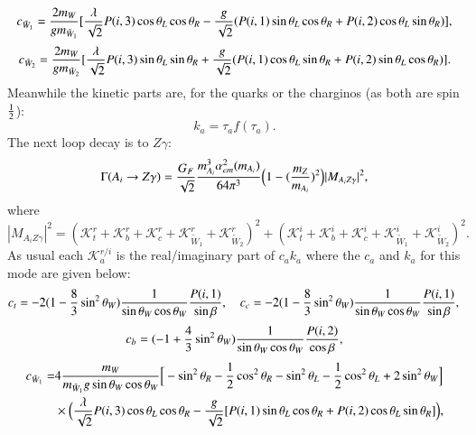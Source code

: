 \documentclass[final,3p,times,pdflatex]{elsarticle}
\begin{document}
\begin{equation}
c_{\tilde{W}_1} = {2 m_{W} \over g m_{\tilde{W}_1}} [{\lambda \over \sqrt{2}} P(i,3) \cos\theta_L \cos\theta_R - {g \over \sqrt{2}}(P(i,1)\sin\theta_L \cos\theta_R + P(i,2) \cos\theta_L \sin\theta_R)],
\end{equation}
\begin{equation}
c_{\tilde{W}_2} = {2 m_{W} \over g m_{\tilde{W}_2}} [{\lambda \over \sqrt{2}} P(i,3) \sin\theta_L \sin\theta_R + {g \over \sqrt{2}}(P(i,1)\cos\theta_L \sin\theta_R + P(i,2) \sin\theta_L \cos\theta_R)].
\end{equation}
Meanwhile the kinetic parts are, for the quarks or the charginos (as both are spin ${1 \over 2}$):
\begin{equation}
k_{a} = \tau_{a}f({\tau_{a}}).
\end{equation}
The next loop decay is to $Z\gamma$:
\begin{equation} \label{AZgamNMSSM}
\Gamma(A_i \rightarrow Z \gamma) = {G_{F} \over \sqrt{2}} {m_{A_i}^3 \alpha_{em}^2(m_{A_i}) \over 64 \pi^3} \Big(1 - ({m_{Z} \over m_{A_i}})^2 \Big) |M_{A_i Z \gamma}|^2,
\end{equation}
where
\begin{equation}
|M_{A_i Z \gamma}|^2 = (\mathcal{K}_{t}^{r} + \mathcal{K}_{b}^{r} +  \mathcal{K}_{c}^{r} +  \mathcal{K}_{\tilde{W}_1}^{r} + \mathcal{K}_{\tilde{W}_2}^{r})^2 + (\mathcal{K}_{t}^{i} + \mathcal{K}_{b}^{i} +  \mathcal{K}_{c}^{i} +  \mathcal{K}_{\tilde{W}_1}^{i} + \mathcal{K}_{\tilde{W}_2}^{i})^2.
\end{equation}
As usual each $\mathcal{K}_{a}^{r/i}$ is the real/imaginary part of $c_{a}k_{a}$ where the $c_{a}$ and $k_{a}$ for this mode are given below:
\begin{equation}
c_{t} = -2(1-{8 \over 3}\sin^2 \theta_W){1 \over \sin\theta_W \cos\theta_W}{P(i,1) \over \sin\beta}, \quad \quad \\
c_{c} = -2(1-{8 \over 3}\sin^2 \theta_W){1 \over \sin\theta_W \cos\theta_W}{P(i,1) \over \sin\beta}, \\
\end{equation}
\begin{equation}
c_{b} = (-1+{4 \over 3}\sin^2 \theta_W){1 \over \sin\theta_W \cos\theta_W}{P(i,2) \over \cos\beta} ,
\end{equation}
\begin{equation}
\begin{aligned}
c_{\tilde{W}_1} = & 4{m_{W} \over m_{\tilde{W}_1} g \sin\theta_W \cos\theta_W}\Big[-\sin^2 \theta_R - {1 \over 2}\cos^2 \theta_R - \sin^2 \theta_L - {1 \over 2}\cos^2 \theta_L + 2\sin^2 \theta_W\Big] \\ & \times \Big({\lambda \over \sqrt{2}}P(i,3)\cos\theta_L \cos\theta_R - {g \over \sqrt{2}}[P(i,1)\sin\theta_L \cos\theta_R + P(i,2)\cos\theta_L \sin\theta_R]\Big),
\end{aligned}
\end{equation}
\end{document}
